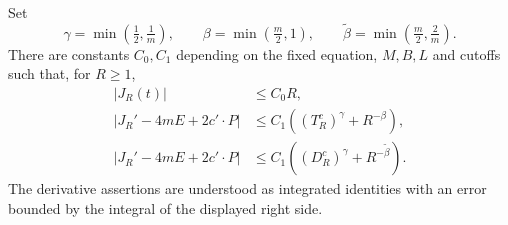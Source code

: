 \begin{lemma}
\label{lem:r11tr-virial}
Set
\[
 \gamma=\min\left(\tfrac12,\tfrac1m\right),\qquad
 \beta=\min\left(\tfrac m2,1\right),\qquad
 \widetilde\beta=\min\left(\tfrac m2,\tfrac2m\right).
\]
There are constants $C_0,C_1$ depending on the fixed equation,
$M,B,L$ and cutoffs such that, for $R\ge1$,
\begin{align}
 |J_R(t)|&\le C_0R,\label{r11tr:endpoint}\\
 |J_R'-4mE+2c'\cdot P|
 &\le C_1\left((T_R^c)^\gamma+R^{-\beta}\right),
 \label{r11tr:virial-cut}\\
 |J_R'-4mE+2c'\cdot P|
 &\le C_1\left((D_R^c)^\gamma+R^{-\widetilde\beta}\right).
 \label{r11tr:virial-literal}
\end{align}
The derivative assertions are understood as integrated identities with
an error bounded by the integral of the displayed right side.
\end{lemma}
